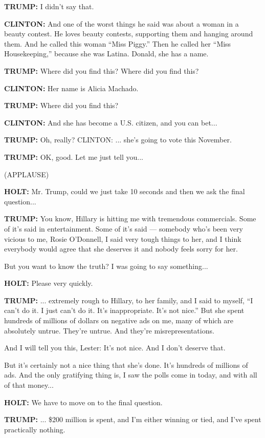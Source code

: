 \textbf{TRUMP:} I didn't say that.

\textbf{CLINTON:} And one of the worst things he said was about a woman
in a beauty contest. He loves beauty contests, supporting them and
hanging around them. And he called this woman ``Miss Piggy.'' Then he
called her ``Miss Housekeeping,'' because she was Latina. Donald, she
has a name.

\textbf{TRUMP:} Where did you find this? Where did you find this?

\textbf{CLINTON:} Her name is Alicia Machado.

\textbf{TRUMP:} Where did you find this?

\textbf{CLINTON:} And she has become a U.S. citizen, and you can bet...

\textbf{TRUMP:} Oh, really? CLINTON: ... she's going to vote this
November.

\textbf{TRUMP:} OK, good. Let me just tell you...

(APPLAUSE)

\textbf{HOLT:} Mr. Trump, could we just take 10 seconds and then we ask
the final question...

\textbf{TRUMP:} You know, Hillary is hitting me with tremendous
commercials. Some of it's said in entertainment. Some of it's said ---
somebody who's been very vicious to me, Rosie O'Donnell, I said very
tough things to her, and I think everybody would agree that she deserves
it and nobody feels sorry for her.

But you want to know the truth? I was going to say something...

\textbf{HOLT:} Please very quickly.

\textbf{TRUMP:} ... extremely rough to Hillary, to her family, and I
said to myself, ``I can't do it. I just can't do it. It's inappropriate.
It's not nice.'' But she spent hundreds of millions of dollars on
negative ads on me, many of which are absolutely untrue. They're untrue.
And they're misrepresentations.

And I will tell you this, Lester: It's not nice. And I don't deserve
that.

But it's certainly not a nice thing that she's done. It's hundreds of
millions of ads. And the only gratifying thing is, I saw the polls come
in today, and with all of that money...

\textbf{HOLT:} We have to move on to the final question.

\textbf{TRUMP:} ... \$200 million is spent, and I'm either winning or
tied, and I've spent practically nothing.

